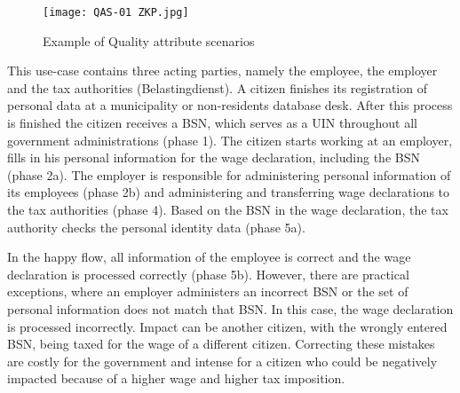     \begin{figure}
        \graphicspath{ {./images/} }
        \centering
        \texttt{[image: QAS-01 ZKP.jpg]}\\
        \caption{Example of Quality attribute scenarios}
        \label{fig:QAS01}
    \end{figure}

This use-case contains three acting parties, namely the employee, the employer and the tax authorities (Belastingdienst).
A citizen finishes its registration of personal data at a municipality or non-residents database desk. After this process is finished the citizen receives a BSN, which serves as a UIN throughout all government administrations (phase 1). The citizen starts working at an employer, fills in his personal information for the wage declaration, including the BSN (phase 2a). The employer is responsible for administering personal information of its employees (phase 2b) and administering and transferring wage declarations to the tax authorities (phase 4). Based on the BSN in the wage declaration, the tax authority checks the personal identity data (phase 5a). \par
In the happy flow, all information of the employee is correct and the wage declaration is processed correctly (phase 5b). However, there are practical exceptions, where an employer administers an incorrect BSN or the set of personal information does not match that BSN. In this case, the wage declaration is processed incorrectly. Impact can be another citizen, with the wrongly entered BSN, being taxed for the wage of a different citizen. Correcting these mistakes are costly for the government and intense for a citizen who could be negatively impacted because of a higher wage and higher tax imposition.

